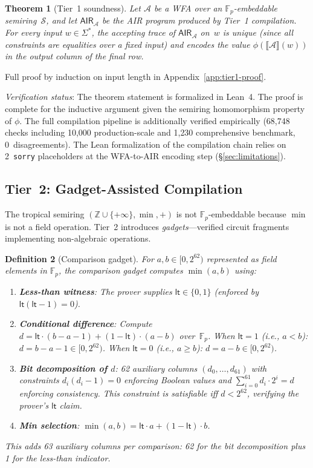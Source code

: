 \documentclass[11pt]{article}
\newtheorem{theorem}{Theorem}[section]
\newtheorem{definition}[theorem]{Definition}
\newcommand{\Z}{\mathbb{Z}}
\newcommand{\F}{\mathbb{F}}
\newcommand{\semiring}[1]{\mathcal{#1}}
\newcommand{\wfa}{\mathcal{A}}
\newcommand{\AIR}{\textsf{AIR}}
\begin{document}
\begin{theorem}[Tier~1 soundness]\label{thm:tier1}
Let $\wfa$ be a WFA over an $\F_p$-embeddable semiring~$\semiring{S}$,
and let $\AIR_\wfa$ be the AIR program produced by Tier~1 compilation.
For every input $w\in\Sigma^*$, the accepting trace of
$\AIR_\wfa$ on~$w$ is unique (since all constraints are equalities
over a fixed input) and encodes the value $\phi(\llbracket\wfa\rrbracket(w))$
in the output column of the final row.
\end{theorem}

\noindent Full proof by induction on input length in
Appendix~\ref{app:tier1-proof}.

\emph{Verification status}: The theorem statement is formalized in
Lean~4.  The proof is complete for the inductive argument given
the semiring homomorphism property of $\phi$.  The full compilation
pipeline is additionally verified empirically (68{,}748 checks including
10{,}000 production-scale and 1{,}230 comprehensive benchmark,
0~disagreements).  The Lean formalization of the compilation chain
relies on 2~\texttt{sorry} placeholders at the WFA-to-AIR encoding step
(\S\ref{sec:limitations}).

\subsection{Tier~2: Gadget-Assisted Compilation}

The tropical semiring $(\Z\cup\{+\infty\},\min,+)$ is not
$\F_p$-embeddable because $\min$ is not a field operation.  Tier~2
introduces \emph{gadgets}---verified circuit fragments implementing
non-algebraic operations.

\begin{definition}[Comparison gadget]\label{def:comparison-gadget}
For $a, b \in [0, 2^{62})$ represented as field elements in $\F_p$,
the comparison gadget computes $\min(a,b)$ using:
\begin{enumerate}[nosep]
\item \textbf{Less-than witness}: The prover supplies
  $\mathsf{lt} \in \{0,1\}$ (enforced by $\mathsf{lt}(\mathsf{lt}-1)=0$).
\item \textbf{Conditional difference}: Compute
  $d = \mathsf{lt}\cdot(b - a - 1) + (1 - \mathsf{lt})\cdot(a - b)$
  over~$\F_p$.
  When $\mathsf{lt}=1$ (i.e., $a < b$): $d = b - a - 1 \in [0, 2^{62})$.
  When $\mathsf{lt}=0$ (i.e., $a \geq b$): $d = a - b \in [0, 2^{62})$.
\item \textbf{Bit decomposition of $d$}: 62 auxiliary columns
  $(d_0,\ldots,d_{61})$ with constraints $d_i(d_i-1)=0$ enforcing
  Boolean values and $\sum_{i=0}^{61} d_i \cdot 2^i = d$ enforcing
  consistency.  This constraint is satisfiable iff $d < 2^{62}$,
  verifying the prover's $\mathsf{lt}$ claim.
\item \textbf{Min selection}:
  $\min(a,b) = \mathsf{lt} \cdot a + (1-\mathsf{lt}) \cdot b$.
\end{enumerate}
This adds 63 auxiliary columns per comparison: 62 for the bit
decomposition plus 1 for the less-than indicator.
\end{definition}
\end{document}
